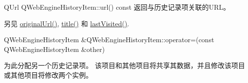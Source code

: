 QUrl QWebEngineHistoryItem::url() const
返回与历史记录项关联的URL。

另见 \href{https://github.com/QtDocumentCN/QtDocumentCN/blob/master/Src/W/QWebEngineHistoryItem/qwebenginehistoryitem.html#originalUrl}{originalUrl()}, \href{https://github.com/QtDocumentCN/QtDocumentCN/blob/master/Src/W/QWebEngineHistoryItem/qwebenginehistoryitem.html#title}{title()} 和 \href{https://github.com/QtDocumentCN/QtDocumentCN/blob/master/Src/W/QWebEngineHistoryItem/qwebenginehistoryitem.html#lastVisited}{lastVisited()}.

QWebEngineHistoryItem \&QWebEngineHistoryItem::operator=(const QWebEngineHistoryItem \&other)


为此分配另一个历史记录项。 该项目和其他项目将共享其数据，并且修改该项目或其他项目将修改两个实例。

